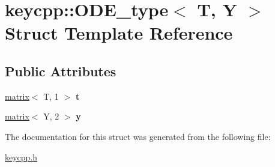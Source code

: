 \hypertarget{structkeycpp_1_1_o_d_e__type}{\section{keycpp\-:\-:O\-D\-E\-\_\-type$<$ T, Y $>$ Struct Template Reference}
\label{structkeycpp_1_1_o_d_e__type}
}
\subsection*{Public Attributes}
\begin{DoxyCompactItemize}
\item 
\hypertarget{structkeycpp_1_1_o_d_e__type_a1f0ccdab9179cc5cb3d46330261ba85b}{\hyperlink{classkeycpp_1_1matrix}{matrix}$<$ T, 1 $>$ {\bfseries t}}\label{structkeycpp_1_1_o_d_e__type_a1f0ccdab9179cc5cb3d46330261ba85b}

\item 
\hypertarget{structkeycpp_1_1_o_d_e__type_aafb0eeede0354cc546c0114ef3c15129}{\hyperlink{classkeycpp_1_1matrix}{matrix}$<$ Y, 2 $>$ {\bfseries y}}\label{structkeycpp_1_1_o_d_e__type_aafb0eeede0354cc546c0114ef3c15129}

\end{DoxyCompactItemize}


The documentation for this struct was generated from the following file\-:\begin{DoxyCompactItemize}
\item 
\hyperlink{keycpp_8h}{keycpp.\-h}\end{DoxyCompactItemize}
